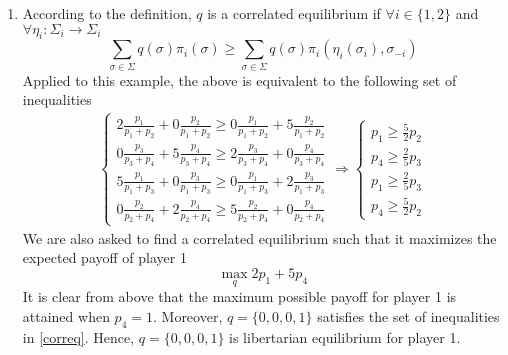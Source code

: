 \documentclass[]{article}
\begin{document}
\begin{enumerate}[label = \roman*)]
	\item According to the definition, $q$ is a correlated equilibrium if $\forall i\in\{1, 2\}$ and $\forall \eta_i:\Sigma_i\to\Sigma_i$
	\begin{equation}
		\sum\limits_{\sigma\in\Sigma}q(\sigma)\pi_i(\sigma)\geq\sum\limits_{\sigma\in\Sigma}q(\sigma)\pi_i(\eta_i(\sigma_i), \sigma_{-i}) \nonumber
	\end{equation}
	Applied to this example, the above is equivalent to the following set of inequalities
	\begin{equation}\label{correq}
		\begin{split}
			\begin{cases}
			2\frac{p_1}{p_1 + p_2} + 0\frac{p_2}{p_1 + p_2} \geq 0\frac{p_1}{p_1 + p_2} + 5\frac{p_2}{p_1 + p_2} \\
			0\frac{p_3}{p_3 + p_4} + 5\frac{p_4}{p_3 + p_4} \geq 2\frac{p_3}{p_3 + p_4} + 0\frac{p_4}{p_3 + p_4} \\
			5\frac{p_1}{p_1 + p_3} + 0\frac{p_3}{p_1 + p_3} \geq 0\frac{p_1}{p_1 + p_3} + 2\frac{p_3}{p_1 + p_3} \\
			0\frac{p_2}{p_2 + p_4} + 2\frac{p_4}{p_2 + p_4} \geq 5\frac{p_2}{p_2 + p_4} + 0\frac{p_4}{p_2 + p_4}
			\end{cases} \Longrightarrow \begin{cases}
			p_1 \geq \frac{5}{2}p_2 \\
			p_4 \geq \frac{2}{5}p_3 \\
			p_1 \geq \frac{2}{5}p_3 \\
			p_4 \geq \frac{5}{2}p_2
			\end{cases}
		\end{split}
	\end{equation}
	We are also asked to find a correlated equilibrium such that it maximizes the expected payoff of player 1
	\begin{equation}
		\max\limits_{q} 2p_1 + 5p_4 \nonumber
	\end{equation}
	It is clear from above that the maximum possible payoff for player 1 is attained when $p_4 = 1$. Moreover, $q = \{0, 0, 0, 1\}$ satisfies the set of inequalities in \eqref{correq}. Hence, $q = \{0, 0, 0, 1\}$ is libertarian equilibrium for player 1.
	

\end{enumerate}
\end{document}
